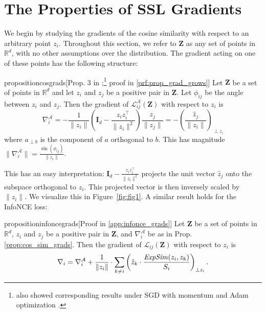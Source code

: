 \section{The Properties of SSL Gradients}
\label{sec:theory}

We begin by studying the gradients of the cosine similarity with respect to an arbitrary point $z_i$. Throughout this section, we refer to $\mathbf{Z}$ as any set of points in $\mathbb{R}^d$, with no other assumptions over the distribution. The gradient acting on one of these points has the following structure:

\begin{restatable}{proposition}{cosgrads}[Prop. 3 in \citet{spherical_embeddings};\footnote{\citet{spherical_embeddings} also showed corresponding results under SGD with momentum and Adam optimization \citep{adam}.} proof in \ref{prf:prop_grad_grows}]
    \label{prop:cos_sim_grads}
    Let $\mathbf{Z}$ be a set of points in $\mathbb{R}^d$ and let $z_i$ and $z_j$ be a positive pair in $\mathbf{Z}$. Let $\phi_{ij}$ be the angle between $z_i$ and $z_j$. Then the gradient of $\mathcal{L}_{ij}^\mathcal{A}(\mathbf{Z})$ with respect to $z_i$ is
    \[ \nabla_i^\mathcal{A} = -\frac{1}{\|z_i\|} \left(\mathbf{I}_d - \frac{z_i z_i^\top}{\|z_i\|^2} \right) \frac{z_j}{\|z_j\|} = -\left( \frac{\hat{z}_j}{\|z_i\|} \right)_{\perp z_i} \]
    where $a_{\perp b}$ is the component of $a$ orthogonal to $b$.
    This has magnitude $\|\nabla_i^\mathcal{A}\| = \frac{\sin(\phi_{ij})}{\|z_i\|}$.
\end{restatable}

\noindent This has an easy interpretation: $\mathbf{I}_d - \frac{z_i z_i^\top}{\|z_i\|^2}$ projects the unit vector $\hat{z}_j$ onto the subspace orthogonal to $z_i$. This projected vector is then inversely scaled by $\|z_i\|$. We visualize this in Figure~\ref{fig:fig1}. A similar result holds for the InfoNCE loss:
\begin{restatable}{proposition}{infoncegrads}[Proof in \ref{app:infonce_grads}]
    \label{cor:infonce_grads}
    Let $\mathbf{Z}$ be a set of points in $\mathbb{R}^d$, $z_i$ and $z_j$ be a positive pair in $\mathbf{Z}$, and $\nabla_i^\mathcal{A}$ be as in Prop. \ref{prop:cos_sim_grads}. Then the gradient of $\mathcal{L}_{ij}(\mathbf{Z})$ with respect to $z_i$ is
    \begin{equation}
        \label{eq:infonce_grads}
        \nabla_i = \nabla_i^\mathcal{A} + \frac{1}{\|z_i\|} \cdot \sum_{k \not\sim i} \left( \hat{z}_k \cdot \frac{\text{\emph{ExpSim}}(z_i, z_k)}{S_i} \right)_{\perp z_i}.
    \end{equation}\vspace*{-0.2cm}
\end{restatable}


